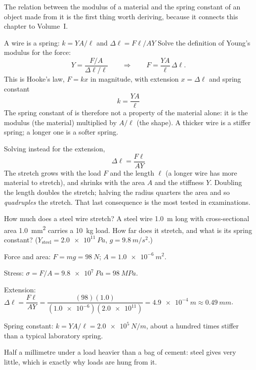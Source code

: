 
The relation between the modulus of a material and the spring constant of an object made from it is the
first thing worth deriving, because it connects this chapter to Volume~I.

\begin{derivbox}{A wire is a spring: $k=YA/\ell$ and $\Delta\ell=F\ell/AY$}
 Solve the definition of Young's modulus for the force:
\[
Y=\frac{F/A}{\Delta\ell/\ell}\qquad\Longrightarrow\qquad F=\frac{YA}{\ell}\,\Delta\ell .
\]
 This is Hooke's law, $F=kx$ in magnitude, with extension $x=\Delta\ell$ and spring constant
\[
\boxed{\;k=\frac{YA}{\ell}\;}
\]
The spring constant of  is therefore not a property of the material alone: it is the
modulus (the material) multiplied by $A/\ell$ (the shape). A thicker wire is a stiffer spring; a longer
one is a softer spring.

 Solving instead for the extension,
\[
\boxed{\;\Delta\ell=\frac{F\ell}{AY}\;}
\]
The stretch grows with the load $F$ and the length $\ell$ (a longer wire has more material to stretch),
and shrinks with the area $A$ and the stiffness $Y$. Doubling the length doubles the stretch; halving the
radius quarters the area and so \emph{quadruples} the stretch. That last consequence is the most tested
in examinations.
\end{derivbox}

\begin{exbox}{How much does a steel wire stretch?}\label{ex:solids-wire}
A steel wire \SI{1.0}{m} long with cross-sectional area \SI{1.0}{mm^2} carries a \SI{10}{kg} load. How far
does it stretch, and what is its spring constant? ($Y_{\text{steel}}=\SI{2.0e11}{Pa}$,
$g=\SI{9.8}{m/s^2}$.)

 Force and area: $F=mg=\SI{98}{N}$; $A=\SI{1.0e-6}{m^2}$.

 Stress: $\sigma=F/A=\SI{9.8e7}{Pa}=\SI{98}{MPa}$.

 Extension: $\Delta\ell=\dfrac{F\ell}{AY}=\dfrac{(98)(1.0)}{(\num{1.0e-6})(\num{2.0e11})}
=\SI{4.9e-4}{m}\approx\SI{0.49}{mm}$.

 Spring constant: $k=YA/\ell=\SI{2.0e5}{N/m}$, about a hundred times stiffer than a typical
laboratory spring.

\smallskip
Half a millimetre under a load heavier than a bag of cement: steel gives very little, which is exactly why
loads are hung from it. 
\end{exbox}

